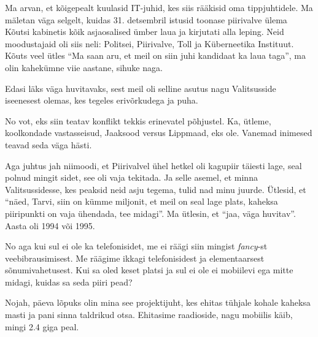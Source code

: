 
Ma arvan, et kõigepealt kuulasid IT-juhid, kes siis rääkisid oma tippjuhtidele. 
Ma mäletan väga selgelt, kuidas 31. detsembril istusid toonase 
piirivalve ülema Kõutsi 
kabinetis kõik asjaosalised ümber laua ja kirjutati alla leping. Neid 
moodustajaid oli siis  neli: Politsei, Piirivalve, Toll ja Küberneetika 
Instituut. Kõuts veel ütles  \enquote{Ma saan aru, et meil on siin juhi 
kandidaat ka laua taga}, ma olin kahekümne viie aastane, sihuke naga. 

Edasi läks väga huvitavaks, sest meil oli selline  asutus nagu 
Valitsusside iseenesest olemas, kes tegeles erivõrkudega ja 
puha.


No vot, eks siin teatav konflikt  tekkis erinevatel põhjustel. Ka, ütleme,  
koolkondade vastasseisud,  Jaaksood versus Lippmaad, eks ole. Vanemad inimesed 
teavad seda väga hästi.

Aga juhtus jah niimoodi, et Piirivalvel ühel hetkel oli kagupiir täiesti lage, 
seal polnud mingit sidet, see oli vaja tekitada. Ja selle asemel, et minna 
Valitsussidesse, kes peaksid neid asju tegema, tulid nad minu juurde. Ütlesid, 
et \enquote{näed, Tarvi, siin on kümme miljonit, et meil on seal lage 
plats, kaheksa piiripunkti on vaja ühendada, tee midagi}. Ma ütlesin, et 
\enquote{jaa, väga huvitav}. Aasta oli 1994 või 1995.


No aga kui sul ei ole ka telefonisidet, me ei räägi siin mingist 
\emph{fancy}-st veebibrausimisest. Me räägime ikkagi telefonisidest ja 
elementaarsest sõnumivahetusest. Kui sa oled keset platsi ja sul ei ole ei 
mobiilevi ega mitte midagi, kuidas sa seda piiri pead?

Nojah, päeva lõpuks olin mina see projektijuht, kes ehitas tühjale kohale  
kaheksa masti ja pani sinna taldrikud otsa. Ehitasime raadioside, nagu mobiilis 
käib, mingi 2.4 giga peal.

